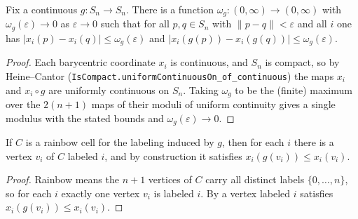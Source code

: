 \begin{lemma}
    \label{lem:coordinate-modulus}
    Fix a continuous $g : S_n \to S_n$. There is a function
    $\omega_g : (0, \infty) \to (0, \infty)$ with $\omega_g(\varepsilon) \to 0$
    as $\varepsilon \to 0$ such that for all $p, q \in S_n$ with
    $\lVert p - q \rVert < \varepsilon$ and all $i$ one has
    $|x_i(p) - x_i(q)| \le \omega_g(\varepsilon)$ and
    $|x_i(g(p)) - x_i(g(q))| \le \omega_g(\varepsilon)$.
\end{lemma}
\begin{proof}
    Each barycentric coordinate $x_i$ is continuous, and $S_n$ is compact, so by
    Heine--Cantor (\texttt{IsCompact.uniformContinuousOn\_of\_continuous}) the maps
    $x_i$ and $x_i \circ g$ are uniformly continuous on $S_n$. Taking $\omega_g$
    to be the (finite) maximum over the $2(n+1)$ maps of their moduli of uniform
    continuity gives a single modulus with the stated bounds and
    $\omega_g(\varepsilon) \to 0$.
\end{proof}

\begin{lemma}
    \label{lem:rainbow-vertex-bound}
    If $C$ is a rainbow cell for the labeling induced by $g$, then for each $i$
    there is a vertex $v_i$ of $C$ labeled $i$, and by construction it satisfies
    $x_i(g(v_i)) \le x_i(v_i)$.
\end{lemma}
\begin{proof}
    Rainbow means the $n+1$ vertices of $C$ carry all distinct labels
    $\{0, \dots, n\}$, so for each $i$ exactly one vertex $v_i$ is labeled $i$. By
     a vertex labeled $i$ satisfies
    $x_i(g(v_i)) \le x_i(v_i)$.
\end{proof}

